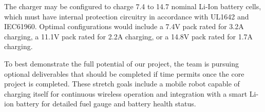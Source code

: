 \documentclass[12pt]{article}
\begin{document}
The charger may be configured to charge 7.4 to 14.7 nominal Li-Ion battery cells, which must have internal protection circuitry in accordance with UL1642 and IEC61960. Optimal configurations would include a 7.4V pack rated for 3.2A charging, a 11.1V pack rated for 2.2A charging, or a 14.8V pack rated for 1.7A charging.\\ \indent

To best demonstrate the full potential of our project, the team is pursuing optional deliverables that should be completed if time permits once the core project is completed. These stretch goals include a mobile robot capable of charging itself for continuous wireless operation and integration with a smart Li-ion battery for detailed fuel gauge and battery health status.

\pagebreak

\tableofcontents

\pagebreak

\listoffigures

\pagebreak

\listoftables

\pagebreak










%
%
%
%
%	
%
\end{document}

